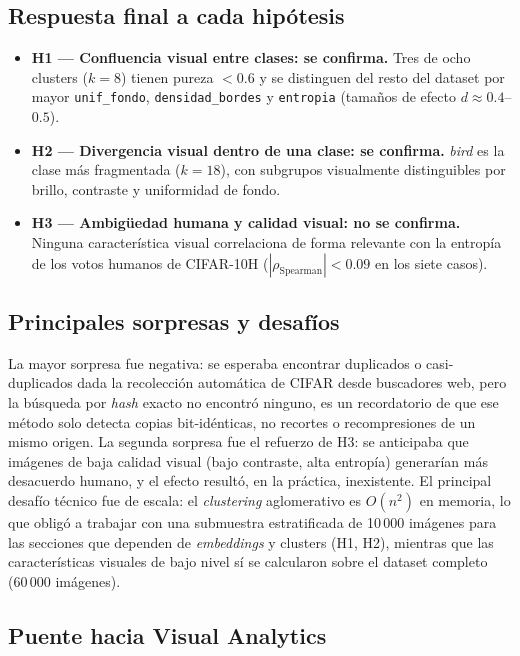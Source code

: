 \documentclass[11pt,a4paper]{article}
\begin{document}
\subsection{Respuesta final a cada hipótesis}

\begin{itemize}[leftmargin=*]
  \item \textbf{H1 --- Confluencia visual entre clases: se confirma.} Tres de
  ocho clusters ($k=8$) tienen pureza $<0.6$ y se distinguen del resto del
  dataset por mayor \texttt{unif\_fondo}, \texttt{densidad\_bordes} y
  \texttt{entropia} (tamaños de efecto $d\approx0.4$--$0.5$).
  \item \textbf{H2 --- Divergencia visual dentro de una clase: se confirma.}
  \emph{bird} es la clase más fragmentada ($k=18$), con subgrupos visualmente
  distinguibles por brillo, contraste y uniformidad de fondo.
  \item \textbf{H3 --- Ambigüedad humana y calidad visual: no se confirma.}
  Ninguna característica visual correlaciona de forma relevante con la entropía
  de los votos humanos de CIFAR-10H ($|\rho_{\text{Spearman}}|<0.09$ en los
  siete casos).
\end{itemize}

\subsection{Principales sorpresas y desafíos}

La mayor sorpresa fue negativa: se esperaba encontrar duplicados o
casi-duplicados dada la recolección automática de CIFAR desde buscadores web,
pero la búsqueda por \emph{hash} exacto no encontró ninguno, es un recordatorio
de que ese método solo detecta copias bit-idénticas, no recortes o
recompresiones de un mismo origen. La segunda sorpresa fue el refuerzo de H3:
se anticipaba que imágenes de baja calidad visual (bajo contraste, alta
entropía) generarían más desacuerdo humano, y el efecto resultó, en la
práctica, inexistente. El principal desafío técnico fue de escala: el
\emph{clustering} aglomerativo es $O(n^2)$ en memoria, lo que obligó a trabajar
con una submuestra estratificada de 10\,000 imágenes para las secciones que
dependen de \emph{embeddings} y clusters (H1, H2), mientras que las
características visuales de bajo nivel sí se calcularon sobre el dataset
completo (60\,000 imágenes).

\subsection{Puente hacia Visual Analytics}
\label{sec:puente}
\end{document}
